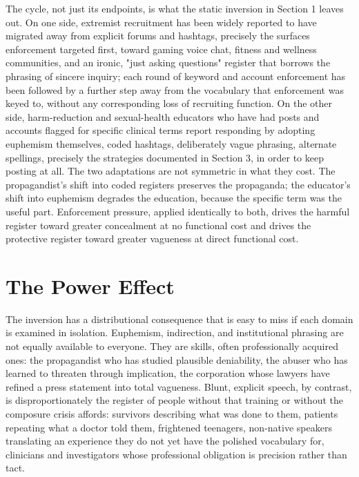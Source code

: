 \documentclass[11pt]{article}
\begin{document}
The cycle, not just its endpoints, is what the static inversion in Section 1 leaves out. On one side, extremist recruitment has been widely reported to have migrated away from explicit forums and hashtags, precisely the surfaces enforcement targeted first, toward gaming voice chat, fitness and wellness communities, and an ironic, "just asking questions" register that borrows the phrasing of sincere inquiry; each round of keyword and account enforcement has been followed by a further step away from the vocabulary that enforcement was keyed to, without any corresponding loss of recruiting function. On the other side, harm-reduction and sexual-health educators who have had posts and accounts flagged for specific clinical terms report responding by adopting euphemism themselves, coded hashtags, deliberately vague phrasing, alternate spellings, precisely the strategies documented in Section 3, in order to keep posting at all. The two adaptations are not symmetric in what they cost. The propagandist's shift into coded registers preserves the propaganda; the educator's shift into euphemism degrades the education, because the specific term was the useful part. Enforcement pressure, applied identically to both, drives the harmful register toward greater concealment at no functional cost and drives the protective register toward greater vagueness at direct functional cost.

\section{The Power Effect}

The inversion has a distributional consequence that is easy to miss if each domain is examined in isolation. Euphemism, indirection, and institutional phrasing are not equally available to everyone. They are skills, often professionally acquired ones: the propagandist who has studied plausible deniability, the abuser who has learned to threaten through implication, the corporation whose lawyers have refined a press statement into total vagueness. Blunt, explicit speech, by contrast, is disproportionately the register of people without that training or without the composure crisis affords: survivors describing what was done to them, patients repeating what a doctor told them, frightened teenagers, non-native speakers translating an experience they do not yet have the polished vocabulary for, clinicians and investigators whose professional obligation is precision rather than tact.
\end{document}
